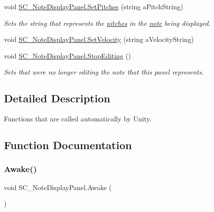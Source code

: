 \begin{DoxyCompactItemize}
void \hyperlink{group___s_c___n_d_p_unity_gad9bf776f0c51cf6170faccf9fc4ac7e0}{S\+C\+\_\+\+Note\+Display\+Panel.\+Set\+Pitches} (string a\+Pitch\+String)
\begin{DoxyCompactList}\small\item\em Sets the string that represents the \hyperlink{group___music_enums_ga508f69b199ea518f935486c990edac1d}{pitches} in the \hyperlink{group___music_structs_struct_music_1_1_combined_note}{note} being displayed. \end{DoxyCompactList}\item 
void \hyperlink{group___s_c___n_d_p_unity_ga8a2fef715606caa884c7b490850fb9b7}{S\+C\+\_\+\+Note\+Display\+Panel.\+Set\+Velocity} (string a\+Velocity\+String)
\item 
void \hyperlink{group___s_c___n_d_p_unity_ga92d0f078c4efd6c207173a10e31b5065}{S\+C\+\_\+\+Note\+Display\+Panel.\+Stop\+Editing} ()
\begin{DoxyCompactList}\small\item\em Sets that we\textquotesingle{}re no longer editing the note that this panel represents. \end{DoxyCompactList}\end{DoxyCompactItemize}


\subsection{Detailed Description}
Functions that are called automatically by Unity. 

\subsection{Function Documentation}
\mbox{\label{group___s_c___n_d_p_unity_ga131f594d4f9b5887acb0de0a8bb5532a}} 
\subsubsection{\texorpdfstring{Awake()}{Awake()}}
{\footnotesize\ttfamily void S\+C\+\_\+\+Note\+Display\+Panel.\+Awake (\begin{DoxyParamCaption}{ }\end{DoxyParamCaption})\hspace{0.3cm}{\ttfamily [private]}}



